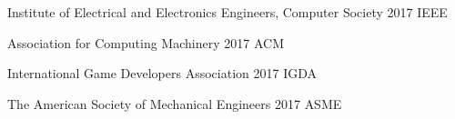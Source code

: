 
\begin{cvhonors}
	
	\cvhonor
	{Institute of Electrical and Electronics Engineers,} %
	{Computer Society} %
	{2017} %
	{IEEE} %
	
	\cvhonor
	{Association for Computing Machinery} %
	{} %
	{2017} %
	{ACM} %
	
	\cvhonor
	{International Game Developers Association} %
	{} %
	{2017} %
	{IGDA} %
	
	\cvhonor
	{The American Society of Mechanical Engineers} %
	{} %
	{2017} %
	{ASME} %
	
	
\end{cvhonors}